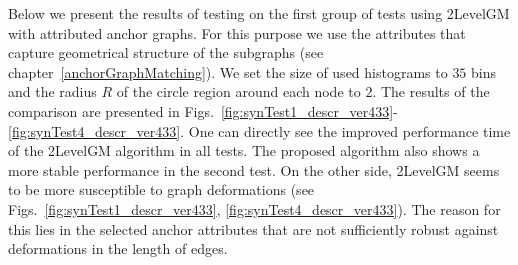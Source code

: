 Below we present the results of testing on the first group of tests using 2LevelGM with attributed anchor graphs. For this purpose we use the attributes that capture geometrical structure of the subgraphs (see chapter~\ref{anchorGraphMatching}). We set the size of used histograms to $35$ bins and the radius $R$ of the circle region around each node to $2$. The results of the comparison are presented in Figs.~\ref{fig:synTest1_descr_ver433}-\ref{fig:synTest4_descr_ver433}. One can directly see the improved performance time of the 2LevelGM algorithm in all tests. The proposed algorithm also shows a more stable performance in the second test. 
On the other side, 2LevelGM seems to be more susceptible to graph deformations (see Figs.~\ref{fig:synTest1_descr_ver433}, \ref{fig:synTest4_descr_ver433}). The reason for this lies in the selected anchor attributes that are not sufficiently robust against deformations in the length of edges.

